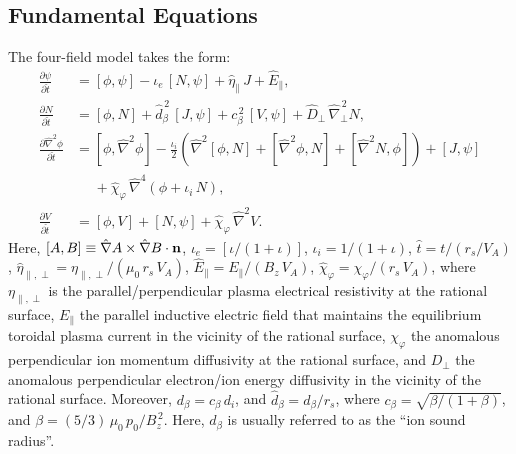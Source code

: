 \documentclass[12pt,prb,aps]{revtex4-1}
\begin{document}
\subsection{Fundamental Equations}
The four-field model takes the form:\,\cite{fw,cole,rf2022}
\begin{align}
\frac{\partial\psi}{\partial\hat{t}}&= [\phi,\psi] -\iota_e\,[N,\psi]
+\hat{\eta}_\parallel\,J + \hat{E}_\parallel,\\[0.5ex]
\frac{\partial N}{\partial \hat{t}}&= [\phi,N] +\hat{d}_\beta^{\,2}\,[J,\psi]+c_\beta^{\,2}\,[V,\psi] 
+ \hat{D}_\perp\,\hat{\nabla}_\perp^{\,2}N,\\[0.5ex]
\frac{\partial \hat{\nabla}^2\phi}{\partial \hat{t}}&= [\phi,\hat{\nabla}^2\phi] - \frac{\iota_i}{2}\left(\hat{\nabla}^2[\phi,N] + [\hat{\nabla}^2\phi,N] + [\hat{\nabla}^2 N,\phi]\right) + [J,\psi] \nonumber\\[0.5ex]&\phantom{=}+\hat{\chi}_\varphi  \,\hat{\nabla}^4\!\left(\phi + \iota_i\,N\right), \\[0.5ex]
\frac{\partial V}{\partial\hat{t}}&= [\phi,V] +[N,\psi] + \hat{\chi}_\varphi\,\hat{\nabla}^2 V.\label{e21}
\end{align}
Here, $[A,B]\equiv \hat{\nabla} A\times \hat{\nabla} B\cdot {\bf n}$, $\iota_e=[\iota/(1+\iota)]$, $\iota_i=1/(1+\iota)$, $\hat{t} = t/(r_s/V_A)$, $\hat{\eta}_{\parallel,\perp} = \eta_{\parallel,\perp}/(\mu_0\,r_s\,V_A)$, $\hat{E}_\parallel = E_\parallel/(B_z\,V_A)$, 
$\hat{\chi}_\varphi= \chi_\varphi/(r_s\,V_A)$, where $\eta_{\parallel,\perp}$ is the parallel/perpendicular plasma electrical
resistivity at the rational surface, $E_\parallel$ the parallel inductive electric field that maintains the equilibrium toroidal
plasma current in the vicinity of the rational surface, $\chi_\varphi$  the anomalous perpendicular ion momentum
diffusivity at the rational surface, and $D_\perp$ the  anomalous perpendicular electron/ion  energy diffusivity in the vicinity of the rational surface. 
Moreover, $d_\beta=c_\beta\,d_i$, and $\hat{d}_\beta=d_\beta/r_s$, where $c_\beta = \sqrt{\beta/(1+\beta)}$, and
$\beta=(5/3)\,\mu_0\,p_0/B_z^{\,2}$. Here, $d_\beta$ is usually referred to as the ``ion sound radius''. 
\end{document}
